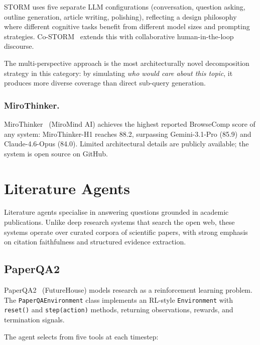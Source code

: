 \documentclass[11pt,a4paper]{article}
\begin{document}
\noindent
STORM uses five separate LLM configurations (conversation, question
asking, outline generation, article writing, polishing), reflecting a
design philosophy where different cognitive tasks benefit from different
model sizes and prompting strategies. Co-STORM~\citep{costorm2024}
extends this with collaborative human-in-the-loop discourse.

The multi-perspective approach is the most architecturally novel
decomposition strategy in this category: by simulating \emph{who would
care about this topic}, it produces more diverse coverage than direct
sub-query generation.

\subsubsection{MiroThinker.}
MiroThinker~\citep{mirothinker2025} (MiroMind AI) achieves the highest
reported BrowseComp score of any system: MiroThinker-H1 reaches 88.2,
surpassing Gemini-3.1-Pro (85.9) and Claude-4.6-Opus (84.0). Limited
architectural details are publicly available; the system is open source
on GitHub.

\section{Literature Agents}
\label{sec:lit}

Literature agents specialise in answering questions grounded in
academic publications. Unlike deep research systems that search the
open web, these systems operate over curated corpora of scientific
papers, with strong emphasis on citation faithfulness and structured
evidence extraction.

\subsection{PaperQA2}

PaperQA2~\citep{paperqa2024} (FutureHouse) models research as a
reinforcement learning problem. The \texttt{PaperQAEnvironment} class
implements an RL-style \texttt{Environment} with \texttt{reset()} and
\texttt{step(action)} methods, returning observations, rewards, and
termination signals.

The agent selects from five tools at each timestep:
\end{document}
